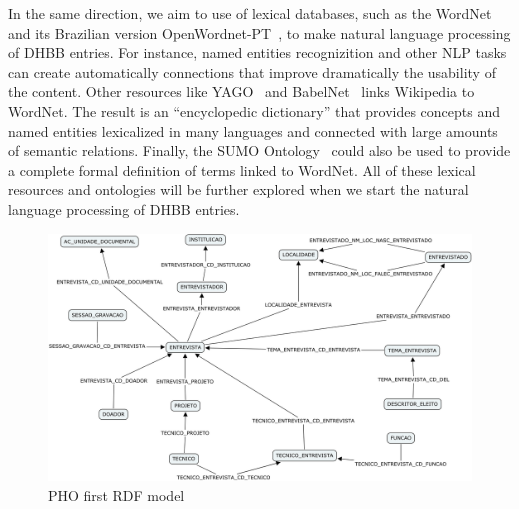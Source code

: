 In the same direction, we aim to use of lexical databases, such as the
WordNet~\cite{wordnet} and its Brazilian version
OpenWordnet-PT~\cite{wordnet-br}, to make natural language processing
of DHBB entries. For instance, named entities recognizition and other
NLP tasks can create automatically connections that improve
dramatically the usability of the content.
Other resources like YAGO~\cite{yago} and BabelNet~\cite{babelnet}
links Wikipedia to WordNet. The result is an ``encyclopedic
dictionary'' that provides concepts and named entities lexicalized in
many languages and connected with large amounts of semantic
relations. Finally, the SUMO Ontology~\cite{sumo} could also be used
to provide a complete formal definition of terms linked to
WordNet. All of these lexical resources and ontologies will be further
explored when we start the natural language processing of DHBB
entries.


\begin{figure}[htbp]
  \centering
  \includegraphics[width=.8\textwidth]{pho.png}
  \caption{PHO first RDF model}\label{fig:pho}
\end{figure}

